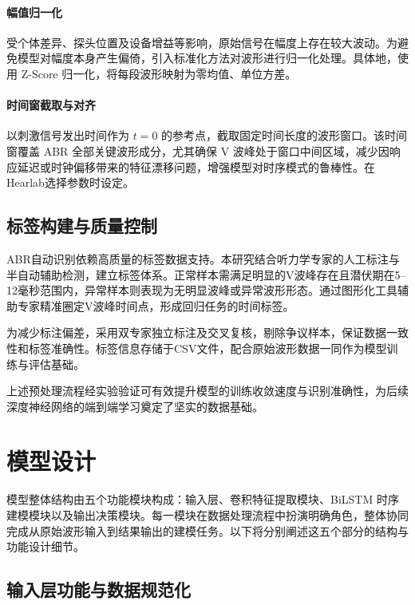 \paragraph*{幅值归一化}
受个体差异、探头位置及设备增益等影响，原始信号在幅度上存在较大波动。为避免模型对幅度本身产生偏倚，引入标准化方法对波形进行归一化处理。具体地，使用 Z-Score 归一化，将每段波形映射为零均值、单位方差。

\paragraph*{时间窗截取与对齐}
以刺激信号发出时间作为 $t = 0$ 的参考点，截取固定时间长度的波形窗口。该时间窗覆盖 ABR 全部关键波形成分，尤其确保 V 波峰处于窗口中间区域，减少因响应延迟或时钟偏移带来的特征漂移问题，增强模型对时序模式的鲁棒性。在Hearlab选择参数时设定。
\subsection*{标签构建与质量控制}
ABR自动识别依赖高质量的标签数据支持。本研究结合听力学专家的人工标注与半自动辅助检测，建立标签体系。正常样本需满足明显的V波峰存在且潜伏期在5–12毫秒范围内，异常样本则表现为无明显波峰或异常波形形态。通过图形化工具辅助专家精准圈定V波峰时间点，形成回归任务的时间标签。

为减少标注偏差，采用双专家独立标注及交叉复核，剔除争议样本，保证数据一致性和标签准确性。标签信息存储于CSV文件，配合原始波形数据一同作为模型训练与评估基础。

上述预处理流程经实验验证可有效提升模型的训练收敛速度与识别准确性，为后续深度神经网络的端到端学习奠定了坚实的数据基础。

\section{模型设计}
模型整体结构由五个功能模块构成：输入层、卷积特征提取模块、BiLSTM 时序建模模块以及输出决策模块。每一模块在数据处理流程中扮演明确角色，整体协同完成从原始波形输入到结果输出的建模任务。以下将分别阐述这五个部分的结构与功能设计细节。

\subsection*{输入层功能与数据规范化}

